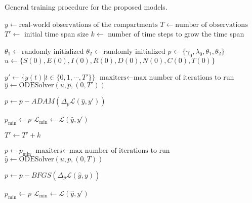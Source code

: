 \begin{algorithm}
    \caption{General training procedure for the proposed models.}
    \label{alg:seir-ude-training}
    \begin{algorithmic}
        \State $y \gets \text{real-world observations of the compartments}$
        \State $T \gets \text{number of observations}$
        \State $T' \gets$ initial time span size
        \State $k \gets$ number of time steps to grow the time span

        \State $\theta_1 \gets \text{randomly initialized}$
        \State $\theta_2 \gets \text{randomly initialized}$
        \State $p \gets \{ \gamma_0, \lambda_0, \theta_1, \theta_2 \}$
        \State $u \gets \{ S(0), E(0), I(0), R(0), D(0), N(0), C(0), T(0) \}$

            \State $y' \gets \{ y(t) | t \in \{ 0,1,\cdots,T' \} \}$
            \State $\text{maxiters} \gets \text{max number of iterations to run}$
                \State $\hat{y} \gets \text{ODESolver}(u, p, (0, T'))$

                \State $p \gets p - ADAM(\Delta_p \mathcal{L}(\hat{y}, y'))$

                    \State $p_\text{min} \gets p$
                    \State $\mathcal{L}_\text{min} \gets \mathcal{L}(\hat{y}, y')$
                \EndIf
            \EndFor

            \State $T' \gets T' + k$
        \EndWhile

        \State $p \gets p_\text{min}$
        \State $\text{maxiters} \gets \text{max number of iterations to run}$
            \State $\hat{y} \gets \text{ODESolver}(u, p, (0, T))$

            \State $p \gets p - BFGS(\Delta_p \mathcal{L}(\hat{y}, y))$

                \State $p_\text{min} \gets p$
                \State $\mathcal{L}_\text{min} \gets \mathcal{L}(\hat{y}, y')$
            \EndIf
        \EndFor
    \end{algorithmic}
\end{algorithm}